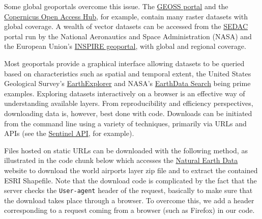 \documentclass[
  letterpaper,
]{krantz}
\begin{document}
Some global geoportals overcome this issue. The
\href{http://www.geoportal.org/}{GEOSS portal} and the
\href{https://scihub.copernicus.eu/}{Copernicus Open Access Hub}, for
example, contain many raster datasets with global coverage. A wealth of
vector datasets can be accessed from the
\href{http://sedac.ciesin.columbia.edu/}{SEDAC} portal run by the
National Aeronautics and Space Administration (NASA) and the European
Union's \href{http://inspire-geoportal.ec.europa.eu/}{INSPIRE
geoportal}, with global and regional coverage.

Most geoportals provide a graphical interface allowing datasets to be
queried based on characteristics such as spatial and temporal extent,
the United States Geological Survey's
\href{https://earthexplorer.usgs.gov/}{EarthExplorer} and NASA's
\href{https://search.earthdata.nasa.gov/search}{EarthData Search} being
prime examples. Exploring datasets interactively on a browser is an
effective way of understanding available layers. From reproducibility
and efficiency perspectives, downloading data is, however, best done
with code. Downloads can be initiated from the command line using a
variety of techniques, primarily via URLs and APIs (see the
\href{https://scihub.copernicus.eu/twiki/do/view/SciHubWebPortal/APIHubDescription}{Sentinel
API}, for example).

Files hosted on static URLs can be downloaded with the following method,
as illustrated in the code chunk below which accesses the
\href{https://www.naturalearthdata.com/}{Natural Earth Data} website to
download the world airports layer zip file and to extract the contained
ESRI Shapefile. Note that the download code is complicated by the fact
that the server checks the \texttt{User-agent} header of the request,
basically to make sure that the download takes place through a browser.
To overcome this, we add a header corresponding to a request coming from
a browser (such as Firefox) in our code.
\end{document}
